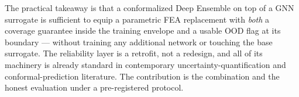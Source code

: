 \documentclass[11pt]{article}
\begin{document}
The practical takeaway is that a conformalized Deep Ensemble on top of a
GNN surrogate is sufficient to equip a parametric FEA replacement with
\emph{both} a coverage guarantee inside the training envelope and a
usable OOD flag at its boundary --- without training any additional
network or touching the base surrogate. The reliability layer is a retrofit,
not a redesign, and all of its machinery is already standard in
contemporary uncertainty-quantification and conformal-prediction
literature. The contribution is the combination and the honest evaluation
under a pre-registered protocol.



\printbibliography
\end{document}
